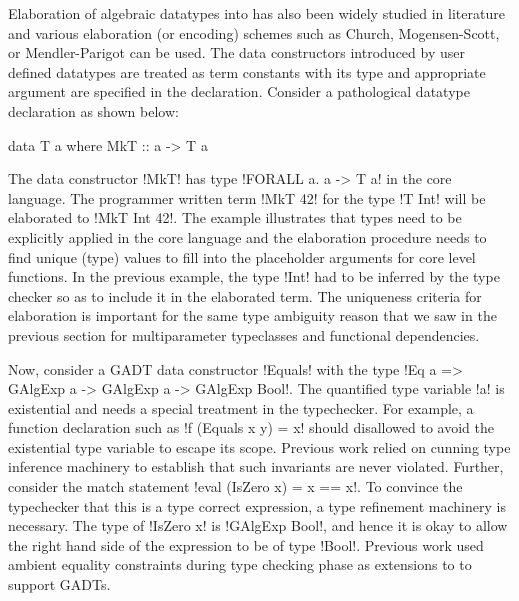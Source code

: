 \documentclass[screen,nonacm,manuscript,review]{acmart} %
\begin{document}
Elaboration of algebraic datatypes into \SF has also been widely
studied in literature and various elaboration (or encoding) schemes
such as Church\cite{jansen_efficient_2005,jansen_programming_2013},
Mogensen-Scott\cite{mogensen_efficient_1992}, or Mendler-Parigot
\cite{parigot_representation_1990, stump_efficiency_2016} can be used.
The data constructors introduced by user defined datatypes are treated as
term constants with its type and appropriate argument are specified in
the declaration. Consider a pathological datatype declaration as shown
below:

\begin{CenteredBox}
\begin{code}
  data T a where MkT :: a -> T a
\end{code}
\end{CenteredBox}

The data constructor !MkT! has type !FORALL a. a -> T a! in the
core language. The programmer written term !MkT 42! for the type
!T Int! will be elaborated to !MkT Int 42!. The example illustrates
that types need to be explicitly applied in the core language and the
elaboration procedure needs to find unique (type) values to fill into the
placeholder arguments for core level functions. In the previous
example, the type !Int! had to be inferred by the type checker so as
to include it in the elaborated term. The uniqueness criteria for
elaboration is important for the same type ambiguity reason that we saw
in the previous section for multiparameter typeclasses and functional
dependencies.

Now, consider a GADT data constructor !Equals! with the type
!Eq a => GAlgExp a -> GAlgExp a -> GAlgExp Bool!. The
quantified type variable !a! is existential and needs a special
treatment in the typechecker. For example, a function declaration such
as !f (Equals x y) = x! should disallowed to avoid the
existential type variable to escape its scope. Previous work relied on
cunning type inference machinery to establish that such
invariants are never violated. Further, consider the match statement
!eval (IsZero x) = x == x!. To convince the typechecker that this is a
type correct expression, a type refinement machinery is necessary. The
type of !IsZero x! is !GAlgExp Bool!, and hence it is okay to allow
the right hand side of the expression to be of type !Bool!. Previous
work\cite{cheney_first-class_2003,xi_guarded_2003,peyton_jones_simple_2006}
used ambient equality constraints during type checking phase as
extensions to \SF to support GADTs.
\end{document}
